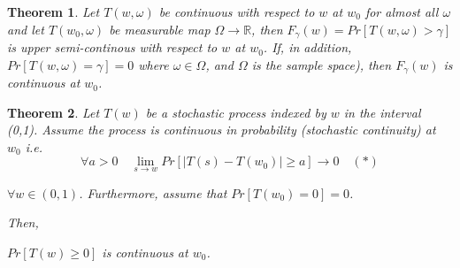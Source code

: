 \documentclass[12pt]{article} %
\newtheorem{thm}{Theorem}
\begin{document}
\begin{thm}
Let $T(w,\omega)$ be continuous with respect to $w$ at $w_0$  for almost all $\omega$ and let $T(w_0,\omega)$ be measurable map $\Omega \rightarrow \mathbb{R}$, then $F_{\gamma}(w)=Pr\left[T(w,\omega)>\gamma \right]$ is upper semi-continous with respect to $w$ at $w_0$. If, in addition, 
$Pr\left[T(w,\omega)=\gamma \right]=0$  where $\omega \in \Omega$, and $\Omega$ is the sample space), then $F_{\gamma}(w)$ is continuous at $w_0$.

\end{thm}


\begin{thm}
Let $T(w)$ be  a stochastic process indexed by $w$ in the interval (0,1). Assume  the process is continuous in probability  (stochastic continuity)   at $w_0$  i.e.
$$ \forall a>0 \quad  \lim_{s \rightarrow w} Pr\left[\left|T(s)-T(w_0) \right| \geq a \right] \rightarrow 0 \quad(*)$$ 

 $\forall w\in (0,1)$. Furthermore, assume that $Pr\left[T(w_0)=0\right]=0$.

Then,

$Pr \left[ T(w) \geq 0\right]$ is continuous at $w_0$.
\end{thm}
\end{document}
